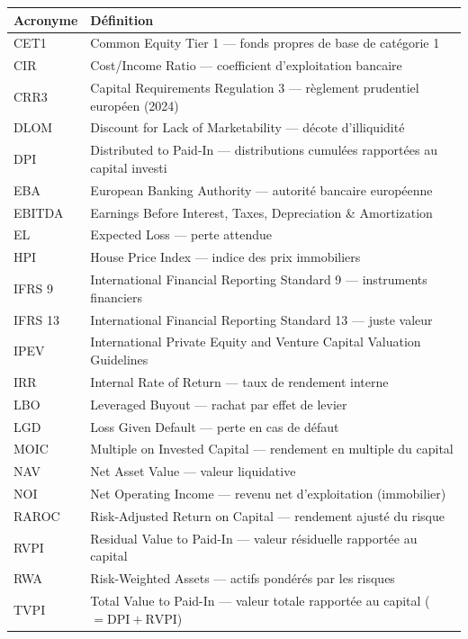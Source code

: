 \documentclass[12pt,a4paper]{article}
\begin{document}
\begin{longtable}{lp{11cm}}
\toprule
\textbf{Acronyme} & \textbf{D\'{e}finition} \\
\midrule
\endfirsthead
CET1 & Common Equity Tier 1 --- fonds propres de base de cat\'{e}gorie 1 \\
CIR & Cost/Income Ratio --- coefficient d'exploitation bancaire \\
CRR3 & Capital Requirements Regulation 3 --- r\`{e}glement prudentiel europ\'{e}en (2024) \\
DLOM & Discount for Lack of Marketability --- d\'{e}cote d'illiquidit\'{e} \\
DPI & Distributed to Paid-In --- distributions cumul\'{e}es rapport\'{e}es au capital investi \\
EBA & European Banking Authority --- autorit\'{e} bancaire europ\'{e}enne \\
EBITDA & Earnings Before Interest, Taxes, Depreciation \& Amortization \\
EL & Expected Loss --- perte attendue \\
HPI & House Price Index --- indice des prix immobiliers \\
IFRS 9 & International Financial Reporting Standard 9 --- instruments financiers \\
IFRS 13 & International Financial Reporting Standard 13 --- juste valeur \\
IPEV & International Private Equity and Venture Capital Valuation Guidelines \\
IRR & Internal Rate of Return --- taux de rendement interne \\
LBO & Leveraged Buyout --- rachat par effet de levier \\
LGD & Loss Given Default --- perte en cas de d\'{e}faut \\
MOIC & Multiple on Invested Capital --- rendement en multiple du capital \\
NAV & Net Asset Value --- valeur liquidative \\
NOI & Net Operating Income --- revenu net d'exploitation (immobilier) \\
RAROC & Risk-Adjusted Return on Capital --- rendement ajust\'{e} du risque \\
RVPI & Residual Value to Paid-In --- valeur r\'{e}siduelle rapport\'{e}e au capital \\
RWA & Risk-Weighted Assets --- actifs pond\'{e}r\'{e}s par les risques \\
TVPI & Total Value to Paid-In --- valeur totale rapport\'{e}e au capital ($= \mathrm{DPI} + \mathrm{RVPI}$) \\
\bottomrule
\end{longtable}
\end{document}
